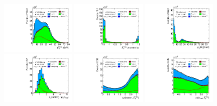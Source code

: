 \begin{figure}[tp]
  \centering
  \includegraphics[width=0.32\textwidth]{figures/presel/met-pt}
  \includegraphics[width=0.32\textwidth]{figures/presel/met-phi-centrality}
  \includegraphics[width=0.32\textwidth]{figures/presel/H-pt} \\
  \includegraphics[width=0.32\textwidth]{figures/presel/taulep-ptratio}
  \includegraphics[width=0.32\textwidth]{figures/presel/lepmet-dphi}
  \includegraphics[width=0.32\textwidth]{figures/presel/taumet-dphi} \\

\end{figure}

